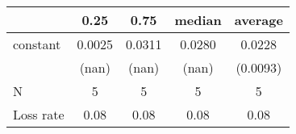 \begin{tabular}{lcccc}
\hline
          &  0.25  &  0.75  & median & average   \\
\midrule
\midrule
constant  & 0.0025 & 0.0311 & 0.0280 & 0.0228    \\
          & (nan)  & (nan)  & (nan)  & (0.0093)  \\
N         & 5      & 5      & 5      & 5         \\
Loss rate & 0.08   & 0.08   & 0.08   & 0.08      \\
\hline
\end{tabular}